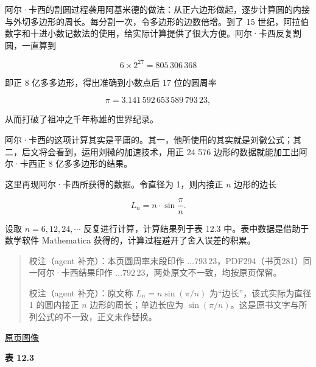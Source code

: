 \documentclass[
  10pt,
  fontset=fandol]{ctexart}
\begin{document}
阿尔·卡西的割圆过程袭用阿基米德的做法：从正六边形做起，逐步计算圆的内接与外切多边形的周长。每分割一次，令多边形的边数倍增。到了 15 世纪，阿拉伯数字和十进小数记数法的使用，给实际计算提供了很大方便。阿尔·卡西反复割圆，一直算到

\[
6\times2^{27}=805\,306\,368
\]

即正 8 亿多多边形，得出准确到小数点后 17 位的圆周率

\[
\pi=3.141\,592\,653\,589\,793\,23,
\]

从而打破了祖冲之千年称雄的世界纪录。

阿尔·卡西的这项计算其实是平庸的。其一，他所使用的其实就是刘徽公式；其二，后文将会看到，运用刘徽的加速技术，用正 24 576 边形的数据就能加工出阿尔·卡西正 8 亿多多边形的结果。

这里再现阿尔·卡西所获得的数据。令直径为 1，则内接正 \(n\) 边形的边长

\[
L_n=n\cdot\sin\frac{\pi}{n}.
\]

设取 \(n=6,12,24,\cdots\) 反复进行计算，计算结果列于表 12.3 中。表中数据是借助于数学软件 Mathematica 获得的，计算过程避开了舍入误差的积累。

\begin{quote}
校注（agent 补充）：本页圆周率末段印作 \(\ldots793\,23\)，PDF294（书页281）同一阿尔·卡西结果印作 \(\ldots792\,23\)，两处原文不一致，均按原页保留。

校注（agent 补充）：原文称 \(L_n=n\sin(\pi/n)\) 为``边长''，该式实际为直径 1 的圆内接正 \(n\) 边形的周长；单边长应为 \(\sin(\pi/n)\)。这是原书文字与所列公式的不一致，正文未作替换。
\end{quote}

\href{../../source-images/pdf-303.jpeg}{原页图像}

\textbf{表 12.3}
\end{document}
